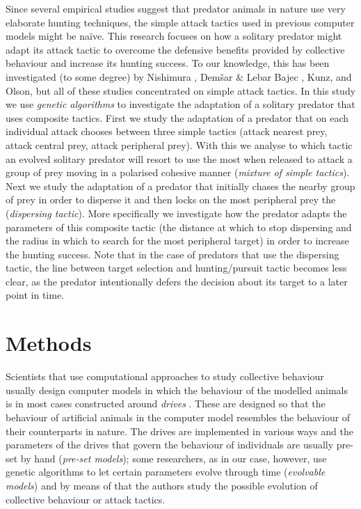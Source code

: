 Since several empirical studies suggest that predator animals in nature use very elaborate hunting techniques, the simple attack tactics used in previous computer models might be naïve. This research focuses on how a solitary predator might adapt its attack tactic to overcome the defensive benefits provided by collective behaviour and increase its hunting success. To our knowledge, this has been investigated (to some degree) by Nishimura \cite{nishimura2002predator}, Demšar \& Lebar Bajec \cite{demsar2014simulated}, Kunz\etal \cite{kunz2006prey}, and Olson\etal \cite{olson2013critical,olson2013predator,olson2016evolution}, but all of these studies concentrated on simple attack tactics. In this study we use \emph{genetic algorithms} \cite{holland1992adaptation} to investigate the adaptation of a solitary predator that uses composite tactics. First we study the adaptation of a predator that on each individual attack chooses between three simple tactics (attack nearest prey, attack central prey, attack peripheral prey). With this we analyse to which tactic an evolved solitary predator will resort to use the most when released to attack a group of prey moving in a polarised cohesive manner (\emph{mixture of simple tactics}). Next we study the adaptation of a predator that initially chases the nearby group of prey in order to disperse it and then locks on the most peripheral prey the (\emph{dispersing tactic}). More specifically we investigate how the predator adapts the parameters of this composite tactic (\ie the distance at which to stop dispersing and the radius in which to search for the most peripheral target) in order to increase the hunting success. Note that in the case of predators that use the dispersing tactic, the line between target selection and hunting/pursuit tactic becomes less clear, as the predator intentionally defers the decision about its target to a later point in time.

\section{Methods}

Scientists that use computational approaches to study collective behaviour usually design computer models in which the behaviour of the modelled animals is in most cases constructed around \emph{drives} \cite{lebarbajec2009organized,reynolds1987flocks,vicsek2012collective}. These are designed so that the behaviour of artificial animals in the computer model resembles the behaviour of their counterparts in nature. The drives are implemented in various ways and the parameters of the drives that govern the behaviour of individuals are usually pre-set by hand (\ie \emph{pre-set models}); some researchers, as in our case, however, use genetic algorithms \cite{holland1992adaptation} to let certain parameters evolve through time (\ie \emph{evolvable models}) and by means of that the authors study the possible evolution of collective behaviour or attack tactics.


